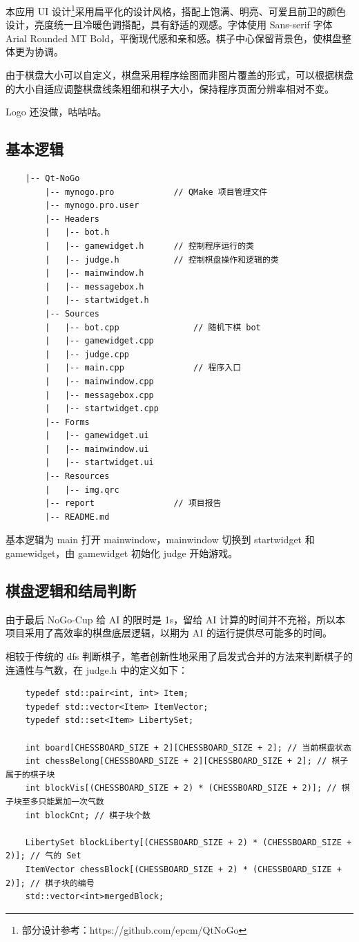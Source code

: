 \documentclass{noithesis}
\begin{document}
	本应用 UI 设计\footnote{部分设计参考：https://github.com/epcm/QtNoGo}采用扁平化的设计风格，搭配上饱满、明亮、可爱且前卫的颜色设计，亮度统一且冷暖色调搭配，具有舒适的观感。字体使用 Sans-serif 字体 Arial Rounded MT Bold，平衡现代感和亲和感。棋子中心保留背景色，使棋盘整体更为协调。
	
	由于棋盘大小可以自定义，棋盘采用程序绘图而非图片覆盖的形式，可以根据棋盘的大小自适应调整棋盘线条粗细和棋子大小，保持程序页面分辨率相对不变。
	
	Logo 还没做，咕咕咕。

	\subsection{基本逻辑}
	
	\begin{verbatim}
	|-- Qt-NoGo
	    |-- mynogo.pro            // QMake 项目管理文件
	    |-- mynogo.pro.user
	    |-- Headers
	    |   |-- bot.h
	    |   |-- gamewidget.h      // 控制程序运行的类
	    |   |-- judge.h           // 控制棋盘操作和逻辑的类
	    |   |-- mainwindow.h
	    |   |-- messagebox.h
	    |   |-- startwidget.h
	    |-- Sources
	    |   |-- bot.cpp               // 随机下棋 bot
	    |   |-- gamewidget.cpp
	    |   |-- judge.cpp
	    |   |-- main.cpp              // 程序入口
	    |   |-- mainwindow.cpp
	    |   |-- messagebox.cpp
	    |   |-- startwidget.cpp
	    |-- Forms
	    |   |-- gamewidget.ui
	    |   |-- mainwindow.ui
	    |   |-- startwidget.ui
	    |-- Resources
	    |   |-- img.qrc
	    |-- report                // 项目报告
	    |-- README.md
	\end{verbatim}

	基本逻辑为 main 打开 mainwindow，mainwindow 切换到 startwidget 和 gamewidget，由 gamewidget 初始化 judge 开始游戏。

	\subsection{棋盘逻辑和结局判断}
	
	由于最后 NoGo-Cup 给 AI 的限时是 1s，留给 AI 计算的时间并不充裕，所以本项目采用了高效率的棋盘底层逻辑，以期为 AI 的运行提供尽可能多的时间。
	
	相较于传统的 dfs 判断棋子，笔者创新性地采用了启发式合并的方法来判断棋子的连通性与气数，在 judge.h 中的定义如下：
	
	\begin{lstlisting}
	typedef std::pair<int, int> Item;
	typedef std::vector<Item> ItemVector;
	typedef std::set<Item> LibertySet;
	
	int board[CHESSBOARD_SIZE + 2][CHESSBOARD_SIZE + 2]; // 当前棋盘状态
	int chessBelong[CHESSBOARD_SIZE + 2][CHESSBOARD_SIZE + 2]; // 棋子属于的棋子块
	int blockVis[(CHESSBOARD_SIZE + 2) * (CHESSBOARD_SIZE + 2)]; // 棋子块至多只能累加一次气数
	int blockCnt; // 棋子块个数
	
	LibertySet blockLiberty[(CHESSBOARD_SIZE + 2) * (CHESSBOARD_SIZE + 2)]; // 气的 Set
	ItemVector chessBlock[(CHESSBOARD_SIZE + 2) * (CHESSBOARD_SIZE + 2)]; // 棋子块的编号
	std::vector<int>mergedBlock;
	\end{lstlisting}
\end{document}
